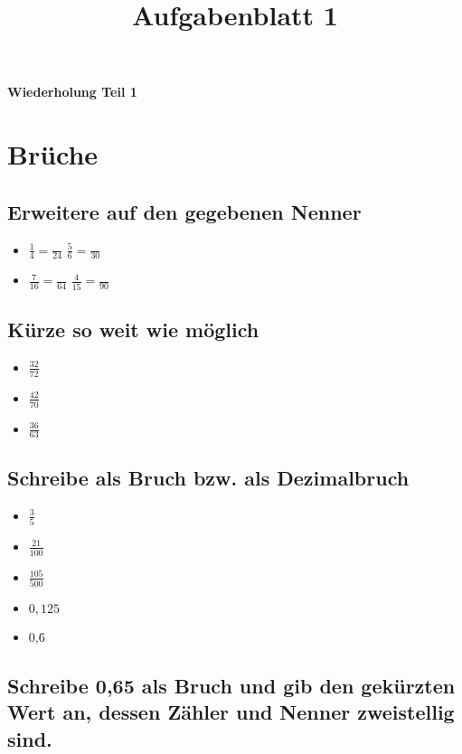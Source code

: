 \documentclass[12pt, arial]{article}
\begin{document}
    \title{Aufgabenblatt 1}
        \begin{center}
            \textbf{ \Large  Wiederholung Teil 1}        
        \end{center}
        \section{Brüche}
        	\subsection{Erweitere auf den gegebenen Nenner}
                \begin{itemize}
                    \item[] $\frac{1}{4} = \frac{ }{24}$ \tabto{5cm} $\frac{5}{6} = \frac{ }{30}$ 
                    \item[] $\frac{7}{16} = \frac{ }{64}$ \tabto{5cm} $\frac{4}{15} = \frac{ }{90}$ 
                \end{itemize}
        	\subsection{Kürze so weit wie möglich}
                \begin{itemize}
                    \item[] $\frac{32}{72}$
                    \item[] $\frac{42}{70}$
                    \item[] $\frac{36}{63}$
                \end{itemize}
        	\subsection{Schreibe als Bruch bzw. als Dezimalbruch}
                \begin{itemize}
                    \item[] $\frac{3}{5}$ 
                    \item[] $\frac{21}{100}$
                    \item[] $\frac{105}{500}$
                    \item[] $0,125$
                    \item[] 0,\={6}
                \end{itemize}
        	\subsection{Schreibe 0,65 als Bruch und gib den gekürzten Wert an, dessen Zähler und Nenner zweistellig sind.}
\end{document}
